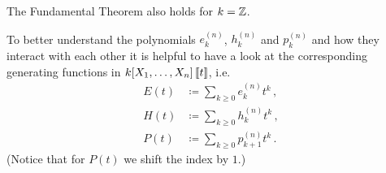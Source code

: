 \begin{rem}
  The Fundamental Theorem also holds for $k = \mathbb{Z}$.
\end{rem}


To better understand the polynomials $e^{(n)}_k$, $h^{(n)}_k$ and $p^{(n)}_k$ and how they interact with each other it is helpful to have a look at the corresponding generating functions in $k[X_1, \dotsc, X_n]\left[\!\left[t\right]\!\right]$, i.e.\
\begin{align*}
              E(t)
  &\coloneqq  \sum_{k \geq 0} e^{(n)}_k t^k \,,
  \\
              H(t)
  &\coloneqq  \sum_{k \geq 0} h^{(n)}_k t^k \,,
  \\
              P(t)
  &\coloneqq  \sum_{k \geq 0} p^{(n)}_{k+1} t^k \,.
\end{align*}
(Notice that for $P(t)$ we shift the index by $1$.)


